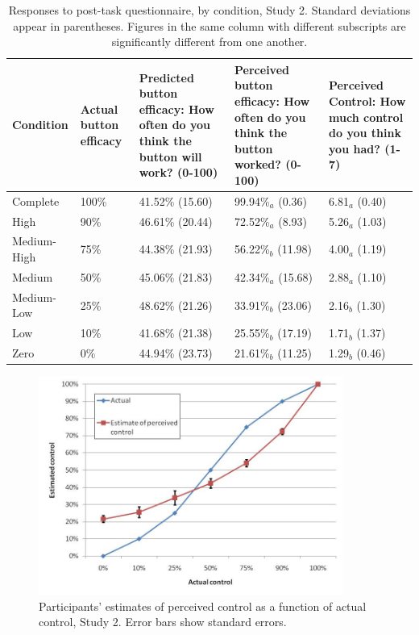 \documentclass[USenglish,letterpaper,12pt,extrafontsizes,oneside,onecolumn,final]{memoir}
\begin{document}
\begin{table} 	
	\setlength{\extrarowheight}{4pt}
	\begin{tabulary}{\linewidth}{lLLLL}
	\toprule
	Condition & \mbox{Actual} \mbox{button} \mbox{efficacy} & Predicted button efficacy: How often do you think the button will work? (0-100) & Perceived button efficacy: How often do you think the button worked? (0-100) & Perceived Control: How much control do you think you had? (1-7)\\
	\midrule
	Complete      & 100\% & 41.52\% (15.60) & 99.94\%$_a$ (0.36)  & 6.81$_a$ (0.40)\\ 
	High          & 90\%  & 46.61\% (20.44) & 72.52\%$_a$ (8.93)  & 5.26$_a$ (1.03)\\ 
	Medium-High   & 75\%  & 44.38\% (21.93) & 56.22\%$_b$ (11.98) & 4.00$_a$ (1.19)\\ 
	Medium        & 50\%  & 45.06\% (21.83) & 42.34\%$_a$ (15.68) & 2.88$_a$ (1.10)\\
	Medium-Low    & 25\%  & 48.62\% (21.26) & 33.91\%$_b$ (23.06) & 2.16$_b$ (1.30)\\ 
	Low           & 10\%  & 41.68\% (21.38) & 25.55\%$_b$ (17.19) & 1.71$_b$ (1.37)\\
	Zero          & 0\%   & 44.94\% (23.73) & 21.61\%$_b$ (11.25) & 1.29$_b$ (0.46)\\
	\bottomrule	 	
	\end{tabulary}
	\caption{Responses to post-task questionnaire, by condition, Study 2. Standard deviations appear in parentheses. Figures in the same column with different subscripts are significantly different from one another.\label{tab:ioc-2}}
\end{table}

\begin{figure}[t]
\begin{center}
\includegraphics[width=10cm]{ioc-fig-3}
\caption{\textsf{Participants' estimates of perceived control as a function of actual control, Study 2. Error bars show standard errors.}\label{fig:ioc-fig-3}}
\end{center}
\end{figure}
\end{document}

